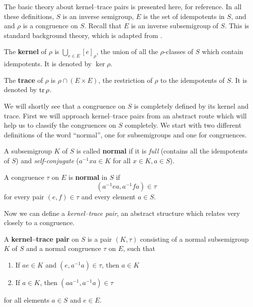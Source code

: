 The basic theory about kernel--trace pairs is presented here, for reference.  In
all these definitions, $S$ is an inverse semigroup, $E$ is the set of
idempotents in $S$, and and $\rho$ is a congruence on $S$.  Recall that $E$ is
an inverse subsemigroup of $S$.  This is standard background theory, which is
adapted from \cite[\S 5.3]{howie}.

\begin{definition}
  \label{def:kernel-cong}
  The \textbf{kernel} of $\rho$ is $\bigcup_{e \in E} [e]_\rho$, the union of
  all the $\rho$-classes of $S$ which contain idempotents.  It is denoted by
  $\ker\rho$.
\end{definition}

\begin{definition}
  \label{def:trace}
  The \textbf{trace} of $\rho$ is $\rho \cap (E \times E)$, the restriction of
  $\rho$ to the idempotents of $S$.  It is denoted by $\operatorname{tr}\rho$.
\end{definition}

We will shortly see that a congruence on $S$ is completely defined by its kernel
and trace.  First we will approach kernel--trace pairs from an abstract route
which will help us to classify the congruences on $S$ completely.  We start with
two different definitions of the word ``normal'', one for subsemigroups and one
for congruences.

\begin{definition}
  \label{def:kernel-normal}
  A subsemigroup $K$ of $S$ is called \textbf{normal} if it is
  \textit{full} (contains all the idempotents of $S$) and
  \textit{self-conjugate} ($a^{-1}xa \in K$ for all $x \in K, a \in S$).
\end{definition}

\begin{definition}
  \label{def:trace-normal}
  A congruence $\tau$ on $E$ is \textbf{normal} in $S$ if
  $$(a^{-1}ea,a^{-1}fa) \in \tau$$
  for every pair $(e,f) \in \tau$ and every element $a \in S$.
\end{definition}

Now we can define a \textit{kernel--trace pair}, an abstract structure which
relates very closely to a congruence.

\begin{definition}
  \label{def:kernel-trace-pair}
  A \textbf{kernel--trace pair} on $S$ is a pair $(K,\tau)$ consisting of a
  normal subsemigroup $K$ of $S$ and a normal congruence $\tau$ on $E$, such
  that
  \begin{enumerate}[\rm(i)]
  \item If $ae \in K$ and $(e,a^{-1}a) \in \tau$, then $a \in K$
  \item If $a \in K$, then $(aa^{-1},a^{-1}a) \in \tau$
  \end{enumerate}
  for all elements $a \in S$ and $e \in E$.
\end{definition}

